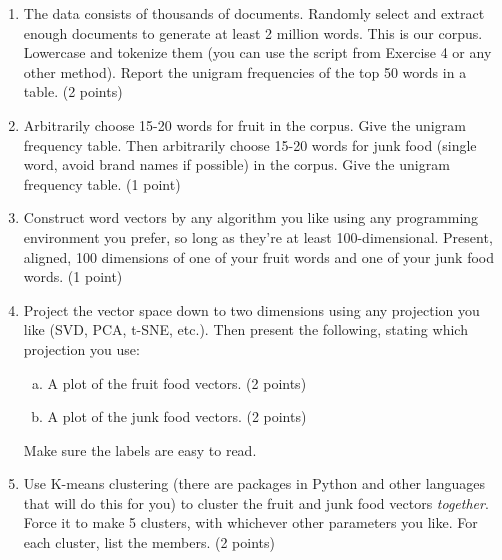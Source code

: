 \documentclass[paper=a4, fontsize=11pt]{scrartcl} %
\numberwithin{equation}{section} %
\numberwithin{figure}{section} %
\numberwithin{table}{section} %
\begin{document}
\begin{enumerate}
\item The data consists of thousands of documents.  Randomly select
  and extract enough documents to generate at least 2 million
  words. This is our corpus.  Lowercase and tokenize them (you can use
  the script from Exercise 4 or any other method).  Report the unigram
  frequencies of the top 50 words in a table. (2 points)
\item Arbitrarily choose 15-20 words for fruit in the corpus. Give the
  unigram frequency table. Then arbitrarily choose 15-20 words for
  junk food (single word, avoid brand names if possible) in the
  corpus.  Give the unigram frequency table. (1 point)
\item Construct word vectors by any algorithm you like using any
  programming environment you prefer, so long as they're at least
  100-dimensional.  Present, aligned, 100 dimensions of one of your
  fruit words and one of your junk food words. (1 point)
\item Project the vector space down to two dimensions using any
  projection you like (SVD, PCA, t-SNE, etc.). Then present the following,
  stating which projection you use:
  \begin{enumerate}[(a)]
  \item A plot of the fruit food vectors. (2 points)
  \item A plot of the junk food vectors. (2 points)
  \end{enumerate}
  Make sure the labels are easy to read.
\item Use K-means clustering (there are packages in Python and other
  languages that will do this for you) to cluster the fruit and junk
  food vectors {\it together}.  Force it to make 5 clusters, with
  whichever other parameters you like.  For each cluster, list the
  members. (2 points)
\end{enumerate}
\end{document}

